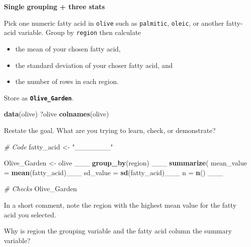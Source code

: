 \documentclass[
]{article}
\newenvironment{Shaded}{\begin{snugshade}}{\end{snugshade}}
\newcommand{\AttributeTok}[1]{\textcolor[rgb]{0.13,0.29,0.53}{#1}}
\newcommand{\CommentTok}[1]{\textcolor[rgb]{0.56,0.35,0.01}{\textit{#1}}}
\newcommand{\FunctionTok}[1]{\textcolor[rgb]{0.13,0.29,0.53}{\textbf{#1}}}
\newcommand{\NormalTok}[1]{#1}
\newcommand{\OtherTok}[1]{\textcolor[rgb]{0.56,0.35,0.01}{#1}}
\newcommand{\StringTok}[1]{\textcolor[rgb]{0.31,0.60,0.02}{#1}}
\begin{document}
\textbf{Single grouping + three stats}

Pick one numeric fatty acid in \texttt{olive} such as \texttt{palmitic},
\texttt{oleic}, or another fatty-acid variable. Group by \texttt{region}
then calculate

\begin{itemize}
\item
  the mean of your chosen fatty acid,
\item
  the standard deviation of your choser fatty acid, and
\item
  the number of rows in each region.
\end{itemize}

Store as \textbf{\texttt{Olive\_Garden}}.

\begin{Shaded}
\begin{Highlighting}[]
\FunctionTok{data}\NormalTok{(olive)}
\NormalTok{?olive}
\FunctionTok{colnames}\NormalTok{(olive)}
\end{Highlighting}
\end{Shaded}

Restate the goal. What are you trying to learn, check, or demonstrate?

\begin{Shaded}
\begin{Highlighting}[]
\CommentTok{\# Code}
\NormalTok{fatty\_acid }\OtherTok{\textless{}{-}} \StringTok{"\_\_\_\_\_\_\_"} 

\NormalTok{Olive\_Garden }\OtherTok{\textless{}{-}}\NormalTok{ olive \_\_\_}
  \FunctionTok{group\_by}\NormalTok{(region) \_\_\_}
  \FunctionTok{summarize}\NormalTok{(}
    \AttributeTok{mean\_value =} \FunctionTok{mean}\NormalTok{(fatty\_acid)\_\_\_}
    \AttributeTok{sd\_value   =} \FunctionTok{sd}\NormalTok{(fatty\_acid)\_\_\_}
    \AttributeTok{n          =} \FunctionTok{n}\NormalTok{()}
\NormalTok{  \_\_\_}
\end{Highlighting}
\end{Shaded}

\begin{Shaded}
\begin{Highlighting}[]
\CommentTok{\#  Checks}
\NormalTok{Olive\_Garden}
\end{Highlighting}
\end{Shaded}

In a short comment, note the region with the highest mean value for the
fatty acid you selected.

Why is region the grouping variable and the fatty acid column the
summary variable?
\end{document}
